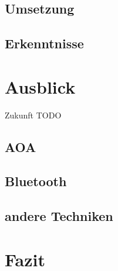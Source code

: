 \documentclass[12pt,journal,compsoc]{IEEEtran}
\begin{document}
\subsection{Umsetzung}

\subsection{Erkenntnisse}





\section{Ausblick}
Zukunft TODO
\subsection{AOA}

\subsection{Bluetooth}
\subsection{andere Techniken}

\section{Fazit}








\end{document}

